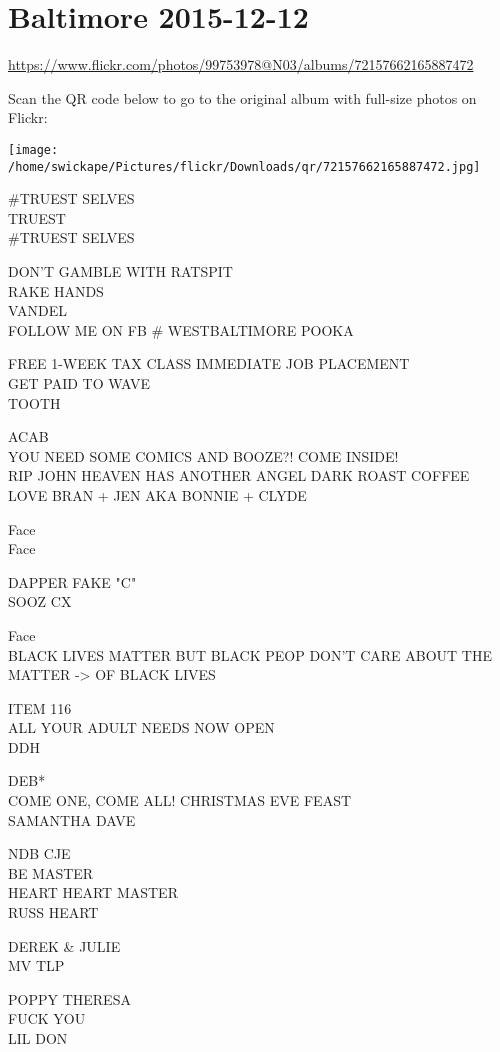 \documentclass[10pt,letterpaper]{article}
\begin{document}
\section*{Baltimore 2015-12-12}

\url{https://www.flickr.com/photos/99753978@N03/albums/72157662165887472}

Scan the QR code below to go to the original album with full-size photos on Flickr:

\texttt{[image: /home/swickape/Pictures/flickr/Downloads/qr/72157662165887472.jpg]}
\pagebreak

\#TRUEST SELVES\\
TRUEST\\
\#TRUEST SELVES

DON'T GAMBLE WITH RATSPIT\\
RAKE HANDS\\
VANDEL\\
FOLLOW ME ON FB \# WESTBALTIMORE POOKA

FREE 1{-}WEEK TAX CLASS IMMEDIATE JOB PLACEMENT\\
GET PAID TO WAVE\\
TOOTH

ACAB\\
YOU NEED SOME COMICS AND BOOZE?!  COME INSIDE!\\
RIP JOHN HEAVEN HAS ANOTHER ANGEL DARK ROAST COFFEE LOVE BRAN + JEN AKA BONNIE + CLYDE

Face\\
Face

DAPPER FAKE "C"\\
SOOZ CX

Face\\
BLACK LIVES MATTER BUT BLACK PEOP DON'T CARE ABOUT THE MATTER {-}> OF BLACK LIVES

ITEM 116\\
ALL YOUR ADULT NEEDS NOW OPEN\\
DDH

DEB*\\
COME ONE, COME ALL!  CHRISTMAS EVE FEAST\\
SAMANTHA DAVE

NDB CJE\\
BE MASTER\\
HEART HEART MASTER\\
RUSS HEART

DEREK \& JULIE\\
MV TLP

POPPY THERESA\\
FUCK YOU\\
LIL DON
\end{document}
